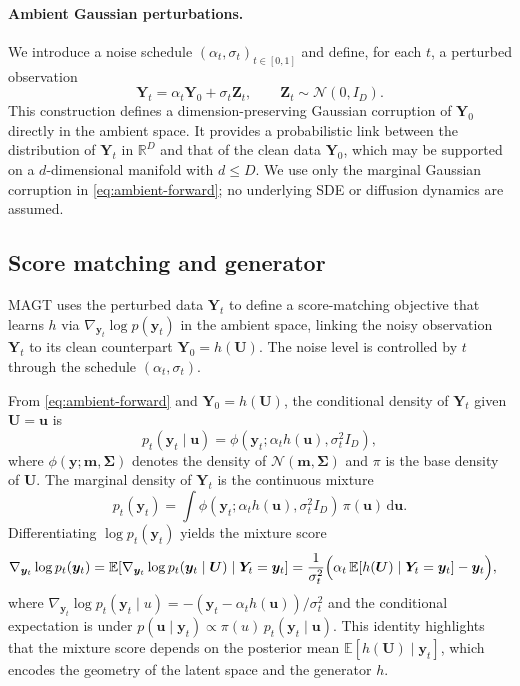 \documentclass[12pt]{article}
\theoremstyle{definition} %
\newcommand{\U}{\bm U}
\newcommand{\Y}{\bm Y}
\newcommand{\Z}{\bm Z}
\newcommand{\y}{\bm y}
\providecommand{\method}{MAGT} %
\begin{document}
\paragraph{Ambient Gaussian perturbations.}
We introduce a noise schedule $(\alpha_t,\sigma_t)_{t\in[0,1]}$ and define,
for each $t$, a perturbed observation
\begin{equation}
\label{eq:ambient-forward}
\Y_t = \alpha_t \Y_0 + \sigma_t \Z_t,
\qquad \Z_t \sim \mathcal{N}(0, I_D).
\end{equation}
This construction defines a dimension-preserving Gaussian corruption of $\Y_0$ directly in the ambient space.
It provides a probabilistic link between the distribution of $\Y_t$ in $\mathbb{R}^D$ and that of the
clean data $\Y_0$, which may be supported on a $d$-dimensional manifold with $d \leq D$.
We use only the marginal Gaussian corruption in \eqref{eq:ambient-forward}; no underlying SDE or diffusion dynamics are assumed.

\subsection{Score matching and generator}
\label{subsec:magnet-score}


\method{} uses the perturbed data $\Y_t$ to define a score-matching objective that learns $h$ via $\nabla_{\y_t}\log p(\y_t)$ in the ambient space, linking the noisy observation $\Y_t$ to its clean counterpart $\Y_0 = h(\U)$. The noise level is controlled by $t$ through the schedule $(\alpha_t,\sigma_t)$.

From \eqref{eq:ambient-forward} and $\Y_0=h(\U)$, the conditional density of $\Y_t$ given $\U=\bm u$ is
\[
p_t(\y_t\mid \bm u)=\phi\!\left(\y_t;\alpha_t h(\bm u),\sigma_t^2 I_D\right),
\]
where $\phi(\y;\bm m,\bm\Sigma)$ denotes the density of $\mathcal N(\bm m,\bm\Sigma)$ and $\pi$ is the base density of $\U$.
The marginal density of $\Y_t$ is the continuous mixture
\[
p_t(\y_t)=\int \phi\!\left(\y_t;\alpha_t h(\bm u),\sigma_t^2 I_D\right)\,\pi(\bm u)\,\mathrm{d}\bm u.
\]
Differentiating $\log p_t(\y_t)$ yields the mixture score
\begin{align}
\label{eq:mixture-score}
\nabla_{\y_t}\log p_t(\y_t)
&=
\mathbb{E}\!\left[
\nabla_{\y_t}\log p_t(\y_t\mid \U)\mid \Y_t=\y_t
\right]
=
\frac{1}{\sigma_t^2}\Bigl(\alpha_t\,\mathbb E[h(\U)\mid \Y_t=\y_t] - \y_t\Bigr),
\end{align}
where $\nabla_{\y_t}\log p_t(\y_t\mid u)=-(\y_t-\alpha_t h(\bm u))/\sigma_t^2$ and the conditional expectation is under $p(\bm u\mid \y_t)\propto \pi(u)\,p_t(\y_t\mid \bm u)$.
This identity highlights that the mixture score depends on the posterior mean 
$\mathbb E[h(\U)\mid \y_t]$, which encodes the geometry of the latent space and the generator $h$.
\end{document}
